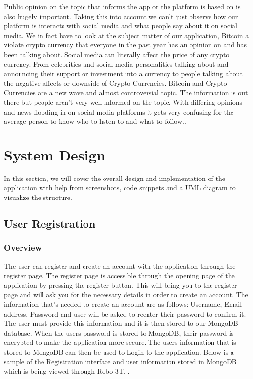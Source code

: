 Public opinion on the topic that informs the app or the platform is based on is also hugely important. Taking this into account we can't just observe how our platform is interacts with social media and what people say about it on social media. We in fact have to look at the subject matter of our application, Bitcoin a violate crypto currency that everyone in the past year has an opinion on and has been talking about. Social media can literally affect the price of any crypto currency. From celebrities and social media personalities talking about and announcing their support or investment into a currency to people talking about the negative affects or downside of Crypto-Currencies. Bitcoin and Crypto-Currencies are a new wave and almost controversial topic. The information is out there but people aren't very well informed on the topic. With differing opinions and news flooding in on social media platforms it gets very confusing for the average person to know who to listen to and what to follow..


\chapter{System Design}
In this section, we will cover the overall design and implementation of the application with help from screenshots, code snippets and a UML diagram to visualize the structure.

\section{User Registration}

\subsection{Overview}
The user can register and create an account with the application through the register page. The register page is accessible through the opening page of the application by pressing the register button. This will bring you to the register page and will ask you for the necessary details in order to create an account. The information that's needed to create an account are as follows:
Username, Email address, Password and user will be asked to reenter their password to confirm it. The user must provide this information and it is then stored to our MongoDB database. When the users password is stored to MongoDB, their password is encrypted to make the application more secure. The users information that is stored to MongoDB can then be used to Login to the application. Below is a sample of the Registration interface and user information stored in MongoDB which is being viewed through Robo 3T.
\linebreak.



